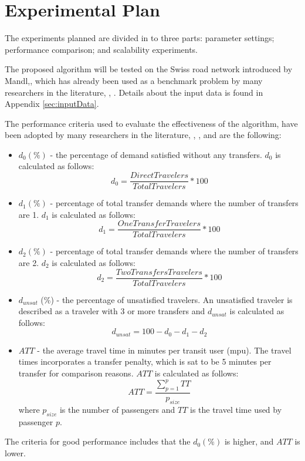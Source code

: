 \section{Experimental Plan}
\label{sec:expPlan}

The experiments planned are divided in to three parts: parameter settings; performance comparison; and scalability experiments.

The proposed algorithm will be tested on the Swiss road network introduced by Mandl,\citep{mandl79}, which has already been used as a benchmark problem by many researchers in the literature\citep{kechagiopoulos14}, \citep{mandl79}, \citep{fan09}. Details about the input data is found in Appendix \vref{sec:inputData}.  

The performance criteria used to evaluate the effectiveness of the algorithm, have been adopted by many researchers in the literature\citep{kechagiopoulos14}, \citep{mandl79}, \citep{fan09}, and are the following:
\begin{itemize}
\item $d_0 (\%)$ - the percentage of demand satisfied without any transfers. $d_0$ is calculated as follows:
$$ d_0 = \frac{DirectTravelers}{TotalTravelers}*100$$
\item $d_1 (\%)$ - percentage of total transfer demands where the number of transfers are 1. $d_1$ is calculated as follows:
$$ d_1 = \frac{OneTransferTravelers}{TotalTravelers}*100$$
\item $d_2 (\%)$ - percentage of total transfer demands where the number of transfers are 2. $d_2$ is calculated as follows:
$$ d_2 = \frac{TwoTransfersTravelers}{TotalTravelers}*100$$
\item $d_{unsat}$ (\%) - the percentage of unsatisfied travelers. An unsatisfied traveler is described as a traveler with 3 or more transfers and $d_{unsat}$ is calculated as follows:
$$ d_{unsat} = 100 - d_0 - d_1 - d_2$$
\item $ATT$  - the average travel time in minutes per transit user (mpu). The travel times incorporates a transfer penalty, which is sat to be 5 minutes per transfer for comparison reasons. $ATT$ is calculated as follows:
$$ATT = \frac{\sum\limits^{p}_{p=1}TT}{p_{size}}$$
where $p_{size}$ is the number of passengers and $TT$ is the travel time used by passenger $p$. 
\end{itemize}

The criteria for good performance includes that the $d_0 (\%)$ is higher, and $ATT$ is lower. 

